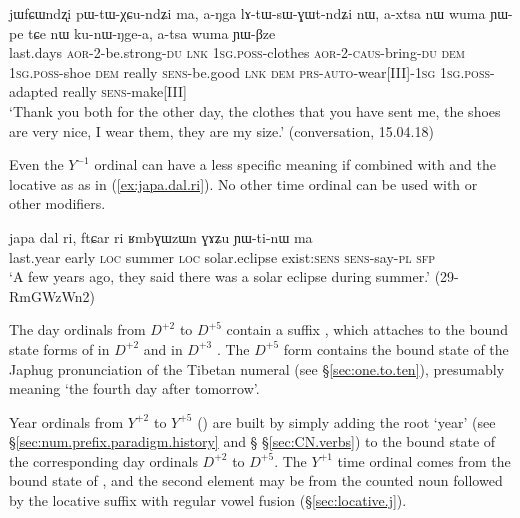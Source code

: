 \begin{exe}
\ex \label{ex:jWfCWndzxi}
\gll jɯfɕɯndʐi pɯ-tɯ-χɕu-ndʑi ma, a-ŋga lɤ-tɯ-sɯ-ɣɯt-ndʑi nɯ, a-xtsa nɯ wuma ɲɯ-pe tɕe nɯ ku-nɯ-ŋge-a,  a-tsa wuma ɲɯ-βze \\ 
last.days \textsc{aor}-2-be.strong-\textsc{du} \textsc{lnk} \textsc{1sg}.\textsc{poss}-clothes \textsc{aor}-2-\textsc{caus}-bring-\textsc{du} \textsc{dem} \textsc{1sg}.\textsc{poss}-shoe \textsc{dem} really \textsc{sens}-be.good \textsc{lnk} \textsc{dem} \textsc{prs}-\textsc{auto}-wear[III]-\textsc{1sg}  \textsc{1sg}.\textsc{poss}-adapted really \textsc{sens}-make[III] \\
\glt `Thank you both for the other day, the clothes that you have sent me, the shoes are very nice, I wear them, they are my size.' (conversation, 15.04.18)
\end{exe}

Even the $Y^{-1}$ ordinal  can have a less specific meaning if combined with  and the locative  as  as in (\ref{ex:japa.dal.ri}). No other time ordinal can be used with  or other modifiers.

\begin{exe}
\ex \label{ex:japa.dal.ri}
\gll japa dal ri, ftɕar ri  ʁmbɣɯzɯn ɣɤʑu ɲɯ-ti-nɯ ma \\
 last.year early \textsc{loc} summer \textsc{loc} solar.eclipse exist:\textsc{sens} \textsc{sens}-say-\textsc{pl} \textsc{sfp}\\
\glt `A few years ago, they said there was a solar eclipse during summer.' (29-RmGWzWn2)
\end{exe}

The day ordinals from $D^{+2}$ to $D^{+5}$ contain a suffix , which attaches to the bound state forms of  in $D^{+2}$  and  in $D^{+3}$ . The $D^{+5}$ form  contains the bound state  of the Japhug pronunciation  of the Tibetan numeral   (see §\ref{sec:one.to.ten}), presumably meaning `the fourth day after tomorrow'.

Year ordinals from $Y^{+2}$ to $Y^{+5}$ () are built by simply adding the root  `year' (see §\ref{sec:num.prefix.paradigm.history} and § §\ref{sec:CN.verbs}) to the bound state of the corresponding day ordinals $D^{+2}$ to $D^{+5}$. The $Y^{+1}$ time ordinal  comes from the bound state of  , and the second element may be from the counted noun  followed by the locative suffix  with regular vowel fusion (§\ref{sec:locative.j}).

